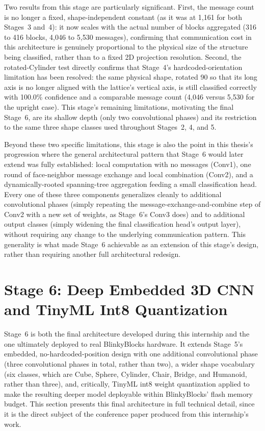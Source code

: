 \documentclass[12pt,a4paper]{report}
\begin{document}
Two results from this stage are particularly significant. First, the message count is no longer a fixed, shape-independent constant (as it was at 1,161 for both Stages~3 and~4): it now scales with the actual number of blocks aggregated (316 to 416 blocks, 4,046 to 5,530 messages), confirming that communication cost in this architecture is genuinely proportional to the physical size of the structure being classified, rather than to a fixed 2D projection resolution. Second, the rotated-Cylinder test directly confirms that Stage~4's hardcoded-orientation limitation has been resolved: the same physical shape, rotated 90\textdegree{} so that its long axis is no longer aligned with the lattice's vertical axis, is still classified correctly with 100.0\% confidence and a comparable message count (4,046 versus 5,530 for the upright case). This stage's remaining limitations, motivating the final Stage~6, are its shallow depth (only two convolutional phases) and its restriction to the same three shape classes used throughout Stages~2, 4, and 5.

Beyond these two specific limitations, this stage is also the point in this thesis's progression where the general architectural pattern that Stage~6 would later extend was fully established: local computation with no messages (Conv1), one round of face-neighbor message exchange and local combination (Conv2), and a dynamically-rooted spanning-tree aggregation feeding a small classification head. Every one of these three components generalizes cleanly to additional convolutional phases (simply repeating the message-exchange-and-combine step of Conv2 with a new set of weights, as Stage~6's Conv3 does) and to additional output classes (simply widening the final classification head's output layer), without requiring any change to the underlying communication pattern. This generality is what made Stage~6 achievable as an extension of this stage's design, rather than requiring another full architectural redesign.

\section{Stage 6: Deep Embedded 3D CNN and TinyML Int8 Quantization}
\label{sec:stage6}

Stage~6 is both the final architecture developed during this internship and the one ultimately deployed to real BlinkyBlocks hardware. It extends Stage~5's embedded, no-hardcoded-position design with one additional convolutional phase (three convolutional phases in total, rather than two), a wider shape vocabulary (six classes, which are Cube, Sphere, Cylinder, Chair, Bridge, and Humanoid, rather than three), and, critically, TinyML int8 weight quantization applied to make the resulting deeper model deployable within BlinkyBlocks' flash memory budget. This section presents this final architecture in full technical detail, since it is the direct subject of the conference paper produced from this internship's work.
\end{document}
